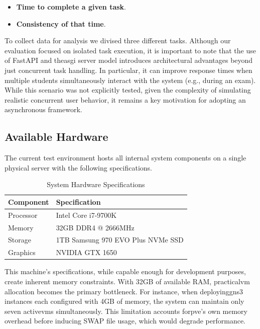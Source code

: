     \begin{itemize}
        \item \textbf{Time to complete a given task}.
        \item \textbf{Consistency of that time}.
    \end{itemize}

    To collect data for analysis we divised three different tasks. Although our evaluation focused on isolated 
    task execution, it is important to note that the use of FastAPI and the\ac{asgi} server model introduces 
    architectural advantages beyond just concurrent task handling. In particular, it can improve response 
    times when multiple students simultaneously interact with the system (e.g., during an exam). While this 
    scenario was not explicitly tested, given the complexity of simulating realistic concurrent user behavior, 
    it remains a key motivation for adopting an asynchronous framework.

    \subsection{Available Hardware}

        The current test environment hosts all internal system components on a single physical server with the 
        following specifications.

        \begin{table}[h]
            \centering
            \caption{System Hardware Specifications}
            \begin{tabular}{|l|l|}
                \hline
                \textbf{Component} & \textbf{Specification} \\ \hline
                Processor & Intel Core i7-9700K \\ \hline
                Memory & 32GB DDR4 @ 2666MHz \\ \hline
                Storage & 1TB Samsung 970 EVO Plus NVMe SSD \\ \hline
                Graphics & NVIDIA GTX 1650 \\ \hline
            \end{tabular}
        \end{table}

        This machine's specifications, while capable enough for development purposes, create inherent memory constraints. With 32GB of available RAM, 
        practical\ac{vm} allocation becomes the primary bottleneck. For instance, when deploying\ac{gns3} instances each configured with 4GB of memory, 
        the system can maintain only seven active\ac{vm}s simultaneously. This limitation accounts for\ac{pve}'s own memory overhead 
        before inducing SWAP file usage, which would degrade performance.

